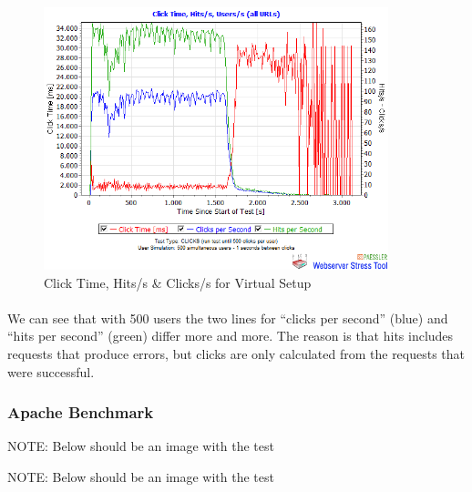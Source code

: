  
\begin{figure}[H]
    \centering
    \includegraphics[width=10cm]{Pictures/vm2.png}
    \caption{Click Time, Hits/s \& Clicks/s for Virtual Setup}
    \label{fig:QQ3}
\end{figure} 


\paragraph{}
We can see that with 500 users the two lines for “clicks per second” (blue) and “hits per second” (green) differ more and more. The reason is that hits includes requests that produce errors, but clicks are only calculated from the requests that were successful.

\subsubsection{Apache Benchmark}

NOTE: Below should be an image with the test 

NOTE: Below should be an image with the test 


